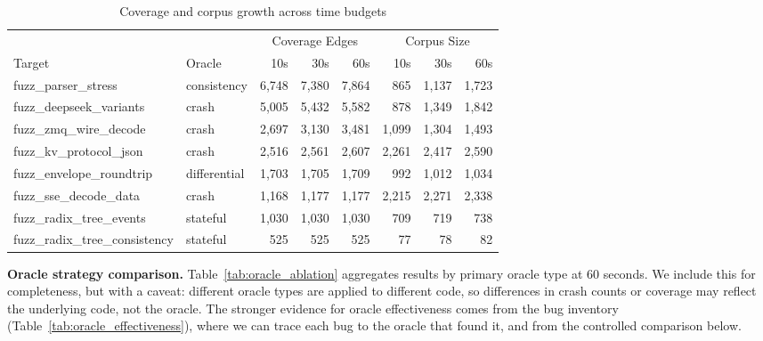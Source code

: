 \documentclass[11pt]{article}
\begin{document}
\begin{table}[H]
\centering
\caption{Coverage and corpus growth across time budgets}
\label{tab:time_scaling}
\footnotesize
\begin{tabular}{@{}llrrrrrr@{}}
\toprule
 & & \multicolumn{3}{c}{Coverage Edges} & \multicolumn{3}{c}{Corpus Size} \\
\cmidrule(lr){3-5} \cmidrule(lr){6-8}
Target & Oracle & 10s & 30s & 60s & 10s & 30s & 60s \\
\midrule
fuzz\_parser\_stress        & consistency  & 6,748  & 7,380  & 7,864  & 865   & 1,137 & 1,723 \\
fuzz\_deepseek\_variants    & crash        & 5,005  & 5,432  & 5,582  & 878   & 1,349 & 1,842 \\
fuzz\_zmq\_wire\_decode     & crash        & 2,697  & 3,130  & 3,481  & 1,099 & 1,304 & 1,493 \\
fuzz\_kv\_protocol\_json    & crash        & 2,516  & 2,561  & 2,607  & 2,261 & 2,417 & 2,590 \\
fuzz\_envelope\_roundtrip   & differential & 1,703  & 1,705  & 1,709  & 992   & 1,012 & 1,034 \\
fuzz\_sse\_decode\_data     & crash        & 1,168  & 1,177  & 1,177  & 2,215 & 2,271 & 2,338 \\
fuzz\_radix\_tree\_events   & stateful     & 1,030  & 1,030  & 1,030  & 709   & 719   & 738 \\
fuzz\_radix\_tree\_consistency & stateful  & 525    & 525    & 525    & 77    & 78    & 82 \\
\bottomrule
\end{tabular}
\end{table}

\textbf{Oracle strategy comparison.} Table~\ref{tab:oracle_ablation} aggregates results by primary oracle type at 60 seconds. We include this for completeness, but with a caveat: different oracle types are applied to different code, so differences in crash counts or coverage may reflect the underlying code, not the oracle. The stronger evidence for oracle effectiveness comes from the bug inventory (Table~\ref{tab:oracle_effectiveness}), where we can trace each bug to the oracle that found it, and from the controlled comparison below.
\end{document}
